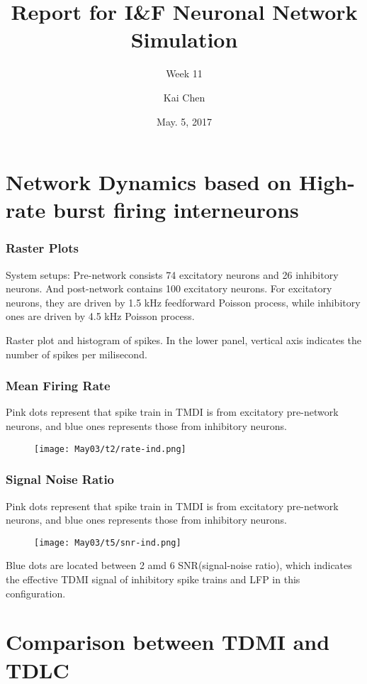 \documentclass{beamer}
\title{Report for I\&F Neuronal Network Simulation}
\subtitle{Week 11}
\author{Kai Chen}
\date{May. 5, 2017}
\begin{document}
\frame{\titlepage}

\section{Network Dynamics based on High-rate burst firing interneurons}

\begin{frame}
  \frametitle{Raster Plots}
  \tiny{System setups: Pre-network consists 74 excitatory neurons and 26 inhibitory neurons. And post-network contains 100 excitatory neurons. For excitatory neurons, they are driven by 1.5 kHz feedforward Poisson process, while inhibitory ones are driven by 4.5 kHz Poisson process.}
  \begin{figure}[h]
    \centering
  \end{figure}
  \tiny{Raster plot and histogram of spikes. In the lower panel, vertical axis indicates the number of spikes per milisecond.}
\end{frame}

\begin{frame}
  \frametitle{Mean Firing Rate}
  \tiny{Pink dots represent that spike train in TMDI is from excitatory pre-network neurons, and blue ones represents those from inhibitory neurons.}
  \begin{figure}[h]
    \centering
    \texttt{[image: May03/t2/rate-ind.png]}
  \end{figure}
\end{frame}

\begin{frame}
  \frametitle{Signal Noise Ratio}
  \tiny{Pink dots represent that spike train in TMDI is from excitatory pre-network neurons, and blue ones represents those from inhibitory neurons.}
  \begin{figure}[h]
    \centering
    \texttt{[image: May03/t5/snr-ind.png]}
  \end{figure}
  \tiny{Blue dots are located between 2 amd 6 SNR(signal-noise ratio), which indicates the effective TDMI signal of inhibitory spike trains and LFP in this configuration.}
\end{frame}

\section{Comparison between TDMI and TDLC}
\end{document}
